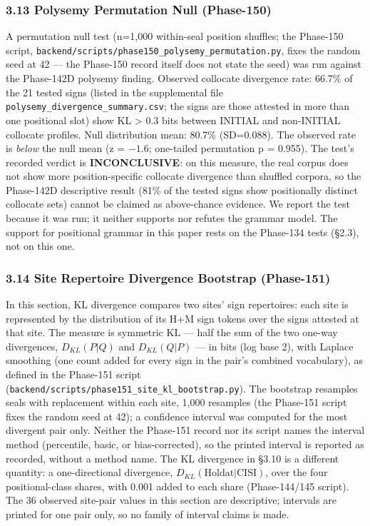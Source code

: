 \documentclass[
]{article}
\begin{document}
\subsubsection{3.13 Polysemy Permutation Null
(Phase-150)}\label{polysemy-permutation-null-phase-150}

A permutation null test (n=1,000 within-seal position shuffles; the Phase-150 script, \texttt{backend/scripts/phase150\_polysemy\_permutation.py}, fixes the random seed at 42 --- the Phase-150 record itself does not state the seed) was run against the Phase-142D polysemy finding. Observed collocate divergence rate: 66.7\% of the 21 tested signs (listed in the supplemental file \texttt{polysemy\_divergence\_summary.csv}; the signs are those attested in more than one positional slot) show KL \textgreater{} 0.3 bits between INITIAL and non-INITIAL collocate profiles. Null distribution mean: 80.7\% (SD=0.088). The observed rate is \emph{below} the null mean (z = $-1.6$; one-tailed permutation p = 0.955). The test's recorded verdict is \textbf{INCONCLUSIVE}: on this measure, the real corpus does not show more position-specific collocate divergence than shuffled corpora, so the Phase-142D descriptive result (81\% of the tested signs show positionally distinct collocate sets) cannot be claimed as above-chance evidence. We report the test because it was run; it neither supports nor refutes the grammar model. The support for positional grammar in this paper rests on the Phase-134 tests (§2.3), not on this one.

\subsubsection{3.14 Site Repertoire Divergence Bootstrap
(Phase-151)}\label{site-repertoire-divergence-bootstrap-phase-151}

In this section, KL divergence compares two sites' sign repertoires: each site is represented by the distribution of its H+M sign tokens over the signs attested at that site. The measure is symmetric KL --- half the sum of the two one-way divergences, $D_{KL}(P|Q)$ and $D_{KL}(Q|P)$ --- in bits (log base 2), with Laplace smoothing (one count added for every sign in the pair's combined vocabulary), as defined in the Phase-151 script (\texttt{backend/scripts/phase151\_site\_kl\_bootstrap.py}). The bootstrap resamples seals with replacement within each site, 1,000 resamples (the Phase-151 script fixes the random seed at 42); a confidence interval was computed for the most divergent pair only. Neither the Phase-151 record nor its script names the interval method (percentile, basic, or bias-corrected), so the printed interval is reported as recorded, without a method name. The KL divergence in §3.10 is a different quantity: a one-directional divergence, $D_{KL}(\text{Holdat}|\text{CISI})$, over the four positional-class shares, with 0.001 added to each share (Phase-144/145 script). The 36 observed site-pair values in this section are descriptive; intervals are printed for one pair only, so no family of interval claims is made.
\end{document}
